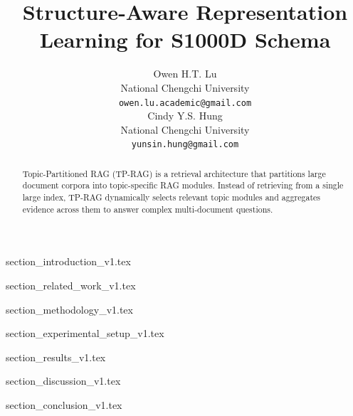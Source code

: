 \documentclass[11pt]{article}
\title{Structure-Aware Representation Learning for S1000D Schema}
\author{Owen H.T. Lu \\
  National Chengchi University  \\
  \texttt{owen.lu.academic@gmail.com} \\\And
  Cindy Y.S. Hung \\
   National Chengchi University  \\
  \texttt{yunsin.hung@gmail.com} \\}
\begin{document}
\maketitle
\begin{abstract}


Topic-Partitioned RAG (TP-RAG) is a retrieval architecture that partitions large document corpora into topic-specific RAG modules. Instead of retrieving from a single large index, TP-RAG dynamically selects relevant topic modules and aggregates evidence across them to answer complex multi-document questions.

\end{abstract}

{section_introduction_v1.tex}

{section_related_work_v1.tex}

{section_methodology_v1.tex}

{section_experimental_setup_v1.tex}

{section_results_v1.tex}

{section_discussion_v1.tex}

{section_conclusion_v1.tex}





\end{document}
